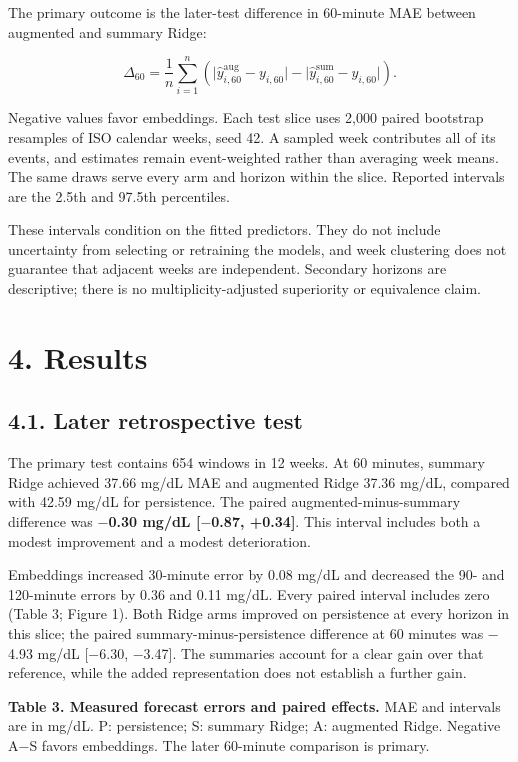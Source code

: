 \documentclass[11pt,letterpaper]{article}
\begin{document}
The primary outcome is the later-test difference in 60-minute MAE
between augmented and summary Ridge:

\[
\Delta_{60}=\frac{1}{n}\sum_{i=1}^{n}
\left(\lvert\hat y^{\mathrm{aug}}_{i,60}-y_{i,60}\rvert
-\lvert\hat y^{\mathrm{sum}}_{i,60}-y_{i,60}\rvert\right).
\]

Negative values favor embeddings. Each test slice uses 2,000 paired
bootstrap resamples of ISO calendar weeks, seed 42. A sampled week
contributes all of its events, and estimates remain event-weighted
rather than averaging week means. The same draws serve every arm and
horizon within the slice. Reported intervals are the 2.5th and 97.5th
percentiles.

These intervals condition on the fitted predictors. They do not include
uncertainty from selecting or retraining the models, and week clustering
does not guarantee that adjacent weeks are independent. Secondary
horizons are descriptive; there is no multiplicity-adjusted superiority
or equivalence claim.

\section{4. Results}\label{results}

\subsection{4.1. Later retrospective
test}\label{later-retrospective-test}

The primary test contains 654 windows in 12 weeks. At 60 minutes,
summary Ridge achieved 37.66 mg/dL MAE and augmented Ridge 37.36 mg/dL,
compared with 42.59 mg/dL for persistence. The paired
augmented-minus-summary difference was \textbf{\ensuremath{-}0.30 mg/dL {[}\ensuremath{-}0.87,
+0.34{]}}. This interval includes both a modest improvement and a modest
deterioration.

Embeddings increased 30-minute error by 0.08 mg/dL and decreased the 90-
and 120-minute errors by 0.36 and 0.11 mg/dL. Every paired interval
includes zero (Table 3; Figure 1). Both Ridge arms improved on
persistence at every horizon in this slice; the paired
summary-minus-persistence difference at 60 minutes was \ensuremath{-}4.93 mg/dL
{[}\ensuremath{-}6.30, \ensuremath{-}3.47{]}. The summaries account for a clear gain over that
reference, while the added representation does not establish a further
gain.

\textbf{Table 3. Measured forecast errors and paired effects.} MAE and
intervals are in mg/dL. P: persistence; S: summary Ridge; A: augmented
Ridge. Negative A\ensuremath{-}S favors embeddings. The later 60-minute comparison is
primary.
\end{document}
